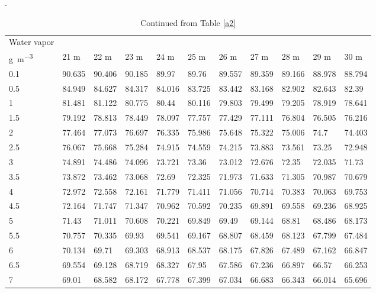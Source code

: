 \begin{bibunit}
\begin{table}[]
	\centering
	\scriptsize
	\caption{Continued from Table \ref{a2}}.
	\label{a3}
	\begin{tabular}{lllllllllll}
		\toprule
				Water vapor &&&&&&&&&&\\
     	\si{\gram\per\meter\cubed}	& 21 \si{\meter}     & 22 \si{\meter}     & 23 \si{\meter}     & 24 \si{\meter}     & 25 \si{\meter}     & 26 \si{\meter}     & 27 \si{\meter}     & 28 \si{\meter}     & 29 \si{\meter}     & 30 \si{\meter}     \\
     		\midrule
			0.1  & 90.635 & 90.406 & 90.185 & 89.97  & 89.76  & 89.557 & 89.359 & 89.166 & 88.978 & 88.794 \\
			0.5  & 84.949 & 84.627 & 84.317 & 84.016 & 83.725 & 83.442 & 83.168 & 82.902 & 82.643 & 82.39  \\
			1    & 81.481 & 81.122 & 80.775 & 80.44  & 80.116 & 79.803 & 79.499 & 79.205 & 78.919 & 78.641 \\
			1.5  & 79.192 & 78.813 & 78.449 & 78.097 & 77.757 & 77.429 & 77.111 & 76.804 & 76.505 & 76.216 \\
			2    & 77.464 & 77.073 & 76.697 & 76.335 & 75.986 & 75.648 & 75.322 & 75.006 & 74.7   & 74.403 \\
			2.5  & 76.067 & 75.668 & 75.284 & 74.915 & 74.559 & 74.215 & 73.883 & 73.561 & 73.25  & 72.948 \\
			3    & 74.891 & 74.486 & 74.096 & 73.721 & 73.36  & 73.012 & 72.676 & 72.35  & 72.035 & 71.73  \\
			3.5  & 73.872 & 73.462 & 73.068 & 72.69  & 72.325 & 71.973 & 71.633 & 71.305 & 70.987 & 70.679 \\
			4    & 72.972 & 72.558 & 72.161 & 71.779 & 71.411 & 71.056 & 70.714 & 70.383 & 70.063 & 69.753 \\
			4.5  & 72.164 & 71.747 & 71.347 & 70.962 & 70.592 & 70.235 & 69.891 & 69.558 & 69.236 & 68.925 \\
			5    & 71.43  & 71.011 & 70.608 & 70.221 & 69.849 & 69.49  & 69.144 & 68.81  & 68.486 & 68.173 \\
			5.5  & 70.757 & 70.335 & 69.93  & 69.541 & 69.167 & 68.807 & 68.459 & 68.123 & 67.799 & 67.484 \\
			6    & 70.134 & 69.71  & 69.303 & 68.913 & 68.537 & 68.175 & 67.826 & 67.489 & 67.162 & 66.847 \\
			6.5  & 69.554 & 69.128 & 68.719 & 68.327 & 67.95  & 67.586 & 67.236 & 66.897 & 66.57  & 66.253 \\
			7    & 69.01  & 68.582 & 68.172 & 67.778 & 67.399 & 67.034 & 66.683 & 66.343 & 66.014 & 65.696 \\

\end{tabular}
\end{table}
\end{bibunit}
